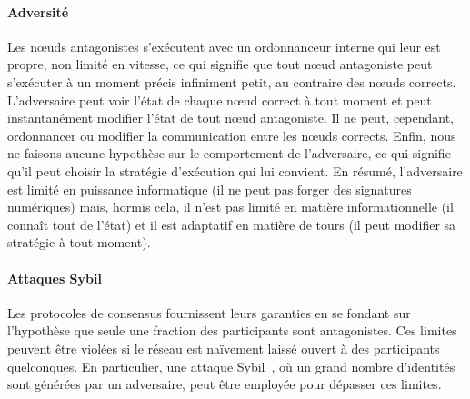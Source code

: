 \documentclass[a4,twocolumn,10pt]{article}
\theoremstyle{definition}
\begin{document}
\paragraph{Adversité}
Les nœuds antagonistes s'exécutent avec un ordonnanceur interne qui leur est propre, non limité en vitesse, ce qui signifie que tout nœud antagoniste peut s'exécuter à un moment précis infiniment petit, au contraire des nœuds corrects.
L'adversaire peut voir l'état de chaque nœud correct à tout moment et peut instantanément modifier l'état de tout nœud antagoniste.
Il ne peut, cependant, ordonnancer ou modifier la communication entre les nœuds corrects.
Enfin, nous ne faisons aucune hypothèse sur le comportement de l'adversaire, ce qui signifie qu'il peut choisir la stratégie d'exécution qui lui convient.
En résumé, l'adversaire est limité en puissance informatique (il ne peut pas forger des signatures numériques) mais, hormis cela, il n'est pas limité en matière informationnelle (il connaît tout de l'état) et il est adaptatif en matière de tours (il peut modifier sa stratégie à tout moment).

\paragraph{Attaques Sybil}
Les protocoles de consensus fournissent leurs garanties en se fondant sur l'hypothèse que seule une fraction des participants sont antagonistes.
Ces limites peuvent être violées si le réseau est naïvement laissé ouvert à des parti\-cipants quelconques.
En particulier, une attaque Sybil~\cite{douceur2002sybil}, où un grand nombre d'identités sont générées par un adversaire, peut être employée pour dépasser ces limites.
\end{document}
